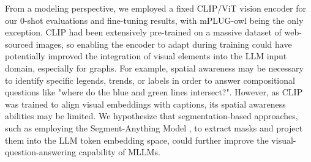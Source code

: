 \documentclass{article}
\begin{document}
From a modeling perspective, we employed a fixed CLIP/ViT vision encoder for our 0-shot evaluations and fine-tuning results, with mPLUG-owl being the only exception. CLIP had been extensively pre-trained on a massive dataset of web-sourced images, so enabling the encoder to adapt during training could have potentially improved the integration of visual elements into the LLM input domain, especially for graphs. For example, spatial awareness may be necessary to identify specific legends, trends, or labels in order to answer compositional questions like "where do the blue and green lines intersect?". However, as CLIP was trained to align visual embeddings with captions, its spatial awareness abilities may be limited. We hypothesize that segmentation-based approaches, such as employing the Segment-Anything Model \cite{kirillov2023segment}, to extract masks and project them into the LLM token embedding space, could further improve the visual-question-answering capability of MLLMs.
\end{document}
